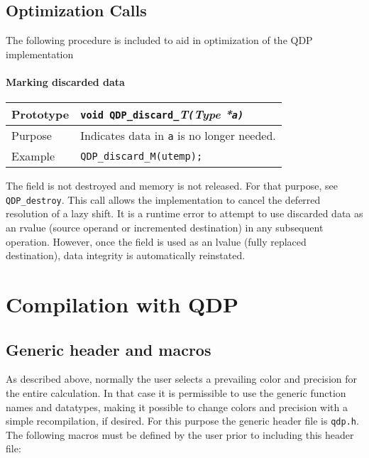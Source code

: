 \documentclass{article}
\newcommand{\ttdash}{{\tt \_}}
\newcommand{\itt}{\it T}
\begin{document}
\subsection{Optimization Calls}

The following procedure is included to aid in optimization of the QDP implementation

\paragraph{Marking discarded data}

\begin{flushleft}
\begin{tabular}{|l|l|}
  \hline
  Prototype      & {\tt void QDP}\ttdash{\tt discard}\ttdash\itt{\tt (}{\it Type *}{\tt a)} \\
\hline
Purpose        & Indicates data in {\tt a} is no longer needed. \\
\hline
Example  & \verb|QDP_discard_M(utemp);| \\
\hline
  \end{tabular}
\end{flushleft}
%
The field is not destroyed and memory is not released.  For that
purpose, see \verb|QDP_destroy|.  This call allows the implementation
to cancel the deferred resolution of a lazy shift.  It is a runtime
error to attempt to use discarded data as an rvalue (source operand or
incremented destination) in any subsequent operation.  However, once
the field is used as an lvalue (fully replaced destination), data
integrity is automatically reinstated.



\section{Compilation with QDP}

\subsection{Generic header and macros}

As described above, normally the user selects a prevailing color and
precision for the entire calculation.  In that case it is permissible
to use the generic function names and datatypes, making it possible to
change colors and precision with a simple recompilation, if desired.
For this purpose the generic header file is {\tt qdp.h}.  The
following macros must be defined by the user prior to including this
header file:
\end{document}
